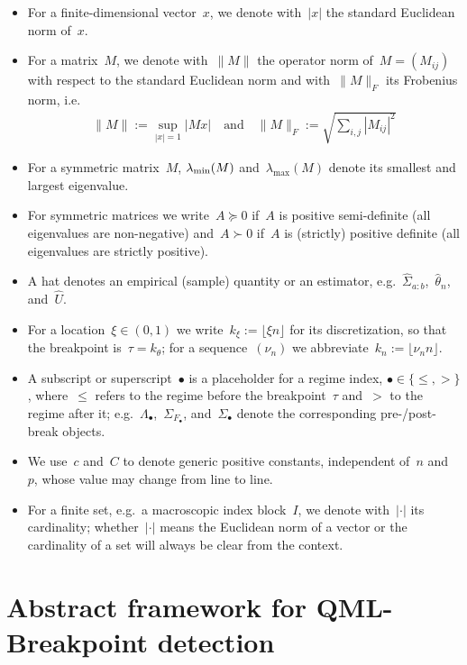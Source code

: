 \documentclass[10pt, letterpaper]{amsart}
\def\min{{\rm min}}
\begin{document}
\begin{itemize}
    \item For a finite-dimensional vector~$x$, we denote with~$|x|$ the standard Euclidean norm of~$x$.
    \item For a matrix~$M$, we denote with~$\| M \|$ the operator norm of~$M=(M_{ij})$ with respect to the standard Euclidean norm and with~$\| M \|_{F}$ its Frobenius norm, i.e.
    \begin{align*}
        \|M \|:= \sup_{|x|=1} | M x| \quad \mbox{and} \quad \|M \|_{F} := \sqrt{\sum_{i,j} |M_{ij}|^2}
    \end{align*}
    \item For a symmetric matrix~$M$, $\lambda_{\min}(M)$ and~$\lambda_{\max}(M)$ denote its smallest and largest eigenvalue.
    \item For symmetric matrices we write~$A \succeq 0$ if~$A$ is positive semi-definite (all eigenvalues are non-negative) and~$A \succ 0$ if~$A$ is (strictly) positive definite (all eigenvalues are strictly positive).
    \item A hat denotes an empirical (sample) quantity or an estimator, e.g.~$\widehat \Sigma_{a:b}$,~$\widehat \theta_n$, and~$\widehat U$.
    \item  For a location~$\xi\in(0,1)$ we write~$k_\xi:=\lfloor \xi n\rfloor$ for its discretization, so that the breakpoint is~$\tau=k_\theta$; for a sequence~$(\nu_n)$ we abbreviate~$k_n:=\lfloor \nu_n n\rfloor$.
    \item A subscript or superscript~$\bullet$ is a placeholder for a regime index, $\bullet\in\{\le,>\}$, where~$\le$ refers to the regime before the breakpoint~$\tau$ and~$>$ to the regime after it; e.g.~$\Lambda_\bullet$,~$\Sigma_{F_\bullet}$, and~$\Sigma_\bullet$ denote the corresponding pre-/post-break objects.
    \item We use~$c$ and~$C$ to denote generic positive constants, independent of~$n$ and~$p$, whose value may change from line to line.
    \item For a finite set, e.g.~a macroscopic index block~$I$, we denote with~$|\cdot|$ its cardinality; whether~$|\cdot|$ means the Euclidean norm of a vector or the cardinality of a set will always be clear from the context.
\end{itemize}

\section{Abstract framework for QML-Breakpoint detection}\label{sec:abstract_QML}
\end{document}
